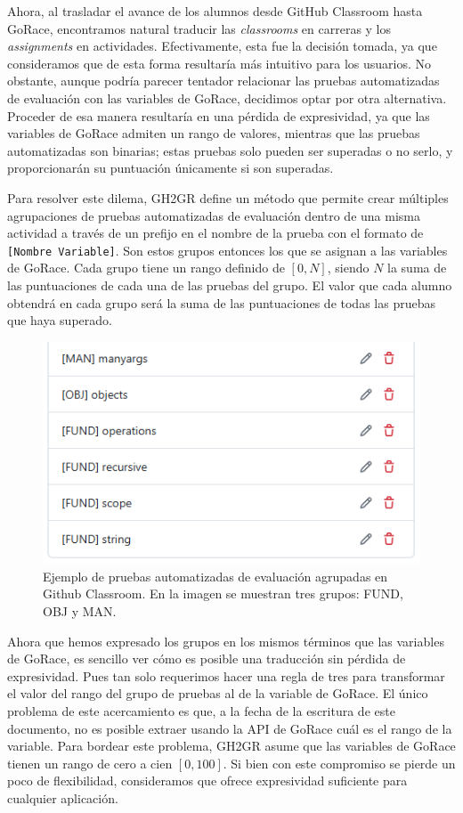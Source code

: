 Ahora, al trasladar el avance de los alumnos desde GitHub Classroom hasta GoRace, encontramos natural traducir las \textit{classrooms} en carreras y los \textit{assignments} en actividades. Efectivamente, esta fue la decisión tomada, ya que consideramos que de esta forma resultaría más intuitivo para los usuarios. No obstante, aunque podría parecer tentador relacionar las pruebas automatizadas de evaluación con las variables de GoRace, decidimos optar por otra alternativa. Proceder de esa manera resultaría en una pérdida de expresividad, ya que las variables de GoRace admiten un rango de valores, mientras que las pruebas automatizadas son binarias; estas pruebas solo pueden ser superadas o no serlo, y proporcionarán su puntuación únicamente si son superadas.

Para resolver este dilema, GH2GR define un método que permite crear múltiples agrupaciones de pruebas automatizadas de evaluación dentro de una misma actividad a través de un prefijo en el nombre de la prueba con el formato de \texttt{[Nombre Variable]}. Son estos grupos entonces los que se asignan a las variables de GoRace. Cada grupo tiene un rango definido de \([0,N]\), siendo \(N\) la suma de las puntuaciones de cada una de las pruebas del grupo. El valor que cada alumno obtendrá en cada grupo será la suma de las puntuaciones de todas las pruebas que haya superado.

\begin{figure}
    \centering
    \includegraphics[width=0.5\linewidth]{images/variable-groups-autograding-tests.png}
    \caption{Ejemplo de pruebas automatizadas de evaluación agrupadas en Github Classroom. En la imagen se muestran tres grupos: FUND, OBJ y MAN.}
    \label{fig:variable-groups-autograding-tests}
\end{figure}

Ahora que hemos expresado los grupos en los mismos términos que las variables de GoRace, es sencillo ver cómo es posible una traducción sin pérdida de expresividad. Pues tan solo requerimos hacer una regla de tres para transformar el valor del rango del grupo de pruebas al de la variable de GoRace. El único problema de este acercamiento es que, a la fecha de la escritura de este documento, no es posible extraer usando la API de GoRace cuál es el rango de la variable. Para bordear este problema, GH2GR asume que las variables de GoRace tienen un rango de cero a cien \([0,100]\). Si bien con este compromiso se pierde un poco de flexibilidad, consideramos que ofrece expresividad suficiente para cualquier aplicación.


